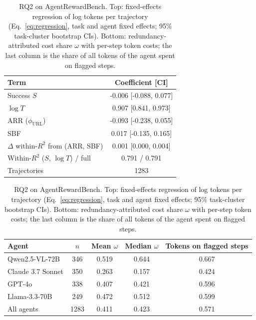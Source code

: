 \begin{table}[t]
\centering
\caption{RQ2 on AgentRewardBench. Top: fixed-effects regression of log tokens per trajectory (Eq.~\ref{eq:regression},
task and agent fixed effects; 95\% task-cluster bootstrap CIs). Bottom: redundancy-attributed cost share $\omega$
with per-step token costs; the last column is the share of all tokens of the agent spent on flagged steps.}
\label{tab:rq2}
\footnotesize
\begin{tabular}{@{}lc@{}}
\toprule
Term & Coefficient [CI] \\
\midrule
Success $S$ & -0.006 [-0.088, 0.077] \\
$\log T$ & 0.907 [0.841, 0.973] \\
ARR ($\phi_{\mathrm{URL}}$) & -0.093 [-0.238, 0.055] \\
SBF & 0.017 [-0.135, 0.165] \\
$\Delta$ within-$R^2$ from (ARR, SBF) & 0.001 [0.000, 0.004] \\
Within-$R^2$ ($S$, $\log T$) / full & 0.791 / 0.791 \\
Trajectories & 1283 \\
\bottomrule
\end{tabular}

\medskip
\begin{tabular}{@{}lcccc@{}}
\toprule
Agent & $n$ & Mean $\omega$ & Median $\omega$ & Tokens on flagged steps \\
\midrule
Qwen2.5-VL-72B & 346 & 0.519 & 0.644 & 0.667 \\
Claude 3.7 Sonnet & 350 & 0.263 & 0.157 & 0.424 \\
GPT-4o & 338 & 0.407 & 0.421 & 0.596 \\
Llama-3.3-70B & 249 & 0.472 & 0.512 & 0.599 \\
All agents & 1283 & 0.411 & 0.423 & 0.571 \\
\bottomrule
\end{tabular}
\end{table}
